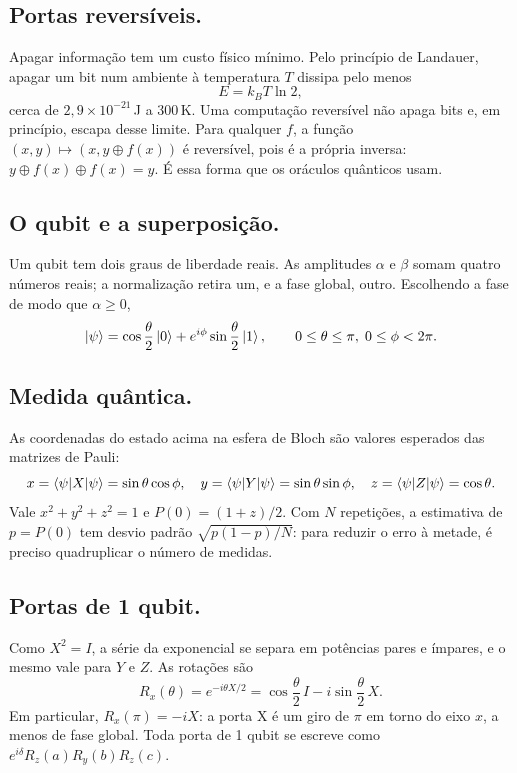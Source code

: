 \subsection{Portas reversíveis.}
Apagar informação tem um custo físico mínimo. Pelo princípio de Landauer, apagar um bit num ambiente à temperatura $T$ dissipa pelo menos
\begin{equation}
    E = k_B T \ln 2,
\end{equation}
cerca de $2{,}9\times 10^{-21}\,$J a $300\,$K. Uma computação reversível não apaga bits e, em princípio, escapa desse limite. Para qualquer $f$, a função $(x, y) \mapsto (x, y \oplus f(x))$ é reversível, pois é a própria inversa: $y \oplus f(x) \oplus f(x) = y$. É essa forma que os oráculos quânticos usam.

\subsection{O qubit e a superposição.}
Um qubit tem dois graus de liberdade reais. As amplitudes $\alpha$ e $\beta$ somam quatro números reais; a normalização retira um, e a fase global, outro. Escolhendo a fase de modo que $\alpha \ge 0$,
\begin{equation}
    \ket{\psi} = \cos\frac{\theta}{2}\ket{0} + e^{i\phi}\sin\frac{\theta}{2}\ket{1}, \qquad 0\le\theta\le\pi,\; 0\le\phi<2\pi.
\end{equation}

\subsection{Medida quântica.}
As coordenadas do estado acima na esfera de Bloch são valores esperados das matrizes de Pauli:
\begin{equation}
    x = \Braket{\psi}{X}{\psi} = \sin\theta\cos\phi, \quad y = \Braket{\psi}{Y}{\psi} = \sin\theta\sin\phi, \quad z = \Braket{\psi}{Z}{\psi} = \cos\theta.
\end{equation}
Vale $x^2+y^2+z^2=1$ e $P(0) = (1+z)/2$. Com $N$ repetições, a estimativa de $p = P(0)$ tem desvio padrão $\sqrt{p(1-p)/N}$: para reduzir o erro à metade, é preciso quadruplicar o número de medidas.

\subsection{Portas de 1 qubit.}
Como $X^2 = I$, a série da exponencial se separa em potências pares e ímpares, e o mesmo vale para $Y$ e $Z$. As rotações são
\begin{equation}
    R_x(\theta) = e^{-i\theta X/2} = \cos\frac{\theta}{2}\, I - i\sin\frac{\theta}{2}\, X.
\end{equation}
Em particular, $R_x(\pi) = -iX$: a porta X é um giro de $\pi$ em torno do eixo $x$, a menos de fase global. Toda porta de 1 qubit se escreve como $e^{i\delta}R_z(a)R_y(b)R_z(c)$.

